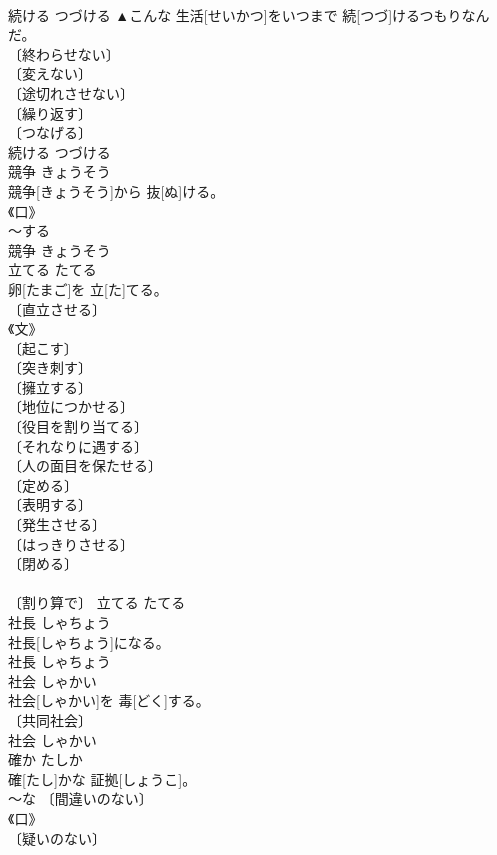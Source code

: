 \documentclass[8pt]{extreport}
\begin{document}
\begin{CJK}{UTF8}{min}
\\	続ける	つづける	▲こんな 生活[せいかつ]をいつまで 続[つづ]けるつもりなんだ。	
\\	〔終わらせない〕 
\\	〔変えない〕 
\\	〔途切れさせない〕 
\\	〔繰り返す〕 
\\	〔つなげる〕 
\\	続ける	つづける	
\\	競争	きょうそう	
\\	競争[きょうそう]から 抜[ぬ]ける。	
\\	《口》 
\\	～する 
\\	競争	きょうそう	
\\	立てる	たてる	
\\	卵[たまご]を 立[た]てる。	
\\	〔直立させる〕 
\\	《文》 
\\	〔起こす〕 
\\	〔突き刺す〕 
\\	〔擁立する〕 
\\	〔地位につかせる〕 
\\	〔役目を割り当てる〕 
\\	〔それなりに遇する〕 
\\	〔人の面目を保たせる〕 
\\	〔定める〕 
\\	〔表明する〕 
\\	〔発生させる〕 
\\	〔はっきりさせる〕 
\\	〔閉める〕 
\\	[⇒あけたて] 
\\	〔割り算で〕	立てる	たてる	
\\	社長	しゃちょう	
\\	社長[しゃちょう]になる。	
\\	[⇒かいしゃ１ (会社の組織と肩書き)]	社長	しゃちょう	
\\	社会	しゃかい	
\\	社会[しゃかい]を 毒[どく]する。	
\\	〔共同社会〕 
\\	社会	しゃかい	
\\	確か	たしか	
\\	確[たし]かな 証拠[しょうこ]。	
\\	～な 〔間違いのない〕 
\\	《口》 
\\	〔疑いのない〕 

\end{CJK}
\end{document}

